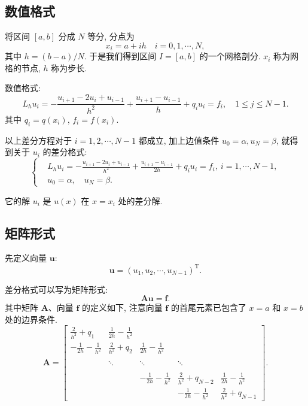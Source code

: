 \documentclass[openany,twoside,12pt]{book}
\theoremstyle{plain}
\begin{document}
\subsection{数值格式}
将区间 $[a,b]$ 分成 $N$ 等分, 分点为
\begin{equation*}
  x_{i}=a+i h \quad i=0,1, \cdots, N,
\end{equation*}
其中 $h=(b-a) / N$. 于是我们得到区间 $I=[a,b]$ 的一个网格剖分. $x_i$ 称为网格的节点, $h$ 称为步长.

数值格式:
\begin{equation*}
  L_{h} u_{i}=-\frac{u_{i+1}-2 u_{i}+u_{i-1}}{h^{2}}+\frac{u_{i+1}-u_{i-1}}{h}+q_{i} u_{i}=f_{i},\quad 1 \leqslant j \leqslant N-1.
\end{equation*}
其中  $q_{i}=q(x_{i})$, $f_{i}=f(x_{i})$.

以上差分方程对于 $i=1,2, \cdots, N-1$ 都成立, 加上边值条件 $u_{0}=\alpha, u_{N}=\beta$, 就得到关于 $u_i$ 的差分格式:
\begin{equation}\label{eqn:fdm}
\left\{\begin{aligned}
& L_{h} u_{i}=-\frac{u_{i+1}-2 u_{i}+u_{i-1}}{h^{2}}+\frac{u_{i+1}-u_{i-1}}{2h}+q_{i} u_{i}=f_{i}, ~ i=1, \cdots, N-1, \\
& u_{0}=\alpha, \quad u_{N}=\beta.
\end{aligned}\right.
\end{equation}

它的解 $u_i$ 是 $u(x)$ 在 $x=x_i$ 处的差分解.


\subsection{矩阵形式}

先定义向量 $\boldsymbol{u}$:
\begin{equation*}
  \boldsymbol{u}=(u_{1}, u_{2}, \cdots, u_{N-1})^{\mathrm{T}}.
\end{equation*}

差分格式可以写为矩阵形式:
\begin{equation*}
  \boldsymbol{A}\boldsymbol{u}=\boldsymbol{f}.
\end{equation*}
其中矩阵 $\boldsymbol{A}$、向量 $\boldsymbol{f}$ 的定义如下, 注意向量 $\boldsymbol{f}$ 的首尾元素已包含了 $x=a$ 和 $x=b$ 处的边界条件.
\begin{equation}\label{equ:matrix1}
\boldsymbol{A}=\begin{bmatrix}
\frac{2}{h^{2}}+q_{1} & \frac{1}{2h}-\frac{1}{h^{2}} &   &  &  \\[8pt]
 -\frac{1}{2h}-\frac{1}{h^{2}} & \frac{2}{h^{2}}+q_{2} & \frac{1}{2h}-\frac{1}{h^{2}}  & &  \\[8pt]
  &  &  &  &    \\
  &  \ddots  & \ddots  &  \ddots  &  \\[8pt]
  &  &  &  &    \\
  &   & -\frac{1}{2h}-\frac{1}{h^{2}} & \frac{2}{h^{2}}+q_{N-2}& \frac{1}{2h}-\frac{1}{h^{2}} \\[8pt]
  &  &  & -\frac{1}{2h}-\frac{1}{h^{2}} & \frac{2}{h^{2}}+q_{N-1}
\end{bmatrix}.
\end{equation}
\end{document}
